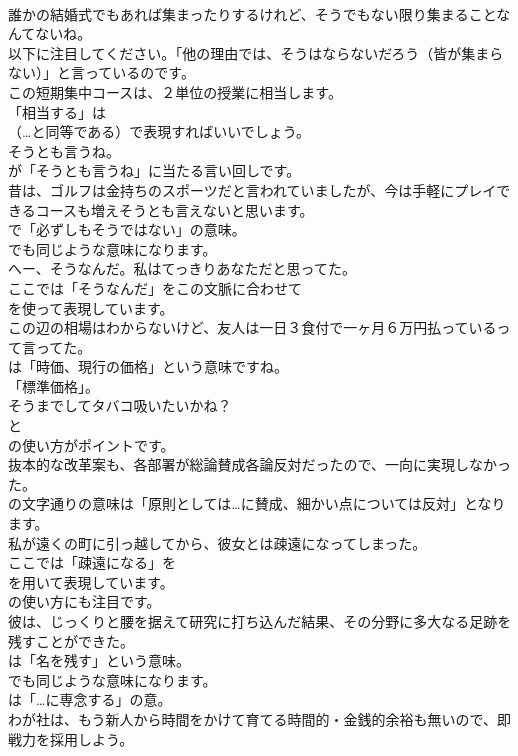 \documentclass[8pt]{extreport}
\begin{document}
\begin{CJK}{UTF8}{min}
\\	誰かの結婚式でもあれば集まったりするけれど、そうでもない限り集まることなんてないね。 
\\	以下に注目してください。「他の理由では、そうはならないだろう（皆が集まらない）」と言っているのです。	
\\	この短期集中コースは、２単位の授業に相当します。 
\\	「相当する」は 
\\	（…と同等である）で表現すればいいでしょう。	
\\	そうとも言うね。 
\\	が「そうとも言うね」に当たる言い回しです。	
\\	昔は、ゴルフは金持ちのスポーツだと言われていましたが、今は手軽にプレイできるコースも増えそうとも言えないと思います。 
\\	で「必ずしもそうではない」の意味。
\\	でも同じような意味になります。	
\\	へー、そうなんだ。私はてっきりあなただと思ってた。 
\\	ここでは「そうなんだ」をこの文脈に合わせて 
\\	を使って表現しています。	
\\	この辺の相場はわからないけど、友人は一日３食付で一ヶ月６万円払っているって言ってた。 
\\	は「時価、現行の価格」という意味ですね。
\\	「標準価格」。	
\\	そうまでしてタバコ吸いたいかね？ 
\\	と 
\\	の使い方がポイントです。	
\\	抜本的な改革案も、各部署が総論賛成各論反対だったので、一向に実現しなかった。 
\\	の文字通りの意味は「原則としては…に賛成、細かい点については反対」となります。	
\\	私が遠くの町に引っ越してから、彼女とは疎遠になってしまった。 
\\	ここでは「疎遠になる」を 
\\	を用いて表現しています。
\\	の使い方にも注目です。	
\\	彼は、じっくりと腰を据えて研究に打ち込んだ結果、その分野に多大なる足跡を残すことができた。 
\\	は「名を残す」という意味。
\\	でも同じような意味になります。
\\	は「…に専念する」の意。	
\\	わが社は、もう新人から時間をかけて育てる時間的・金銭的余裕も無いので、即戦力を採用しよう。 

\end{CJK}
\end{document}
